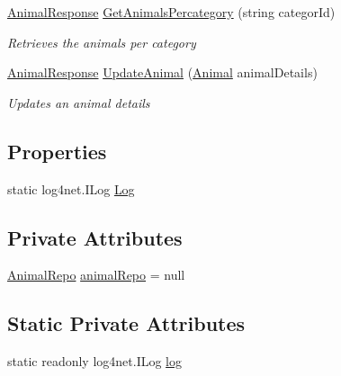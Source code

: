 \begin{DoxyCompactItemize}
\hyperlink{classWildLifeTracker_1_1Response_1_1AnimalResponse}{Animal\+Response} \hyperlink{classWildLifeTracker_1_1Services_1_1AnimalService_a4b971311981c685104e1b3403c87372a}{Get\+Animals\+Percategory} (string categor\+Id)
\begin{DoxyCompactList}\small\item\em Retrieves the animals per category \end{DoxyCompactList}\item 
\hyperlink{classWildLifeTracker_1_1Response_1_1AnimalResponse}{Animal\+Response} \hyperlink{classWildLifeTracker_1_1Services_1_1AnimalService_a993d3155da89897e5403799432be158b}{Update\+Animal} (\hyperlink{classWildLifeTracker_1_1Models_1_1Animal}{Animal} animal\+Details)
\begin{DoxyCompactList}\small\item\em Updates an animal details \end{DoxyCompactList}\end{DoxyCompactItemize}
\subsection*{Properties}
\begin{DoxyCompactItemize}
\item 
static log4net.\+I\+Log \hyperlink{classWildLifeTracker_1_1Services_1_1AnimalService_a5fc9abb86e6110ecd61d0a1a7d740a8a}{Log}
\end{DoxyCompactItemize}
\subsection*{Private Attributes}
\begin{DoxyCompactItemize}
\item 
\hyperlink{classWildLifeTracker_1_1Repository_1_1AnimalRepo}{Animal\+Repo} \hyperlink{classWildLifeTracker_1_1Services_1_1AnimalService_aead7289ee5f2ad9a13ff6b43698a76bb}{animal\+Repo} = null
\end{DoxyCompactItemize}
\subsection*{Static Private Attributes}
\begin{DoxyCompactItemize}
\item 
static readonly log4net.\+I\+Log \hyperlink{classWildLifeTracker_1_1Services_1_1AnimalService_ae6c6142b8525b2f4ac6ee6e003b3106f}{log}
\end{DoxyCompactItemize}


